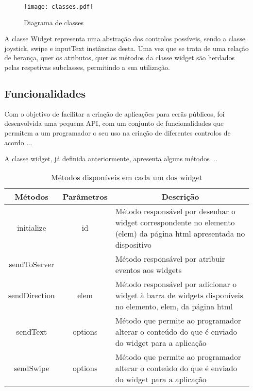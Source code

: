 \begin{figure}[ht]
\centering
\texttt{[image: classes.pdf]}
\caption[\textit{classes}] {Diagrama de classes}
\label{fig:classes}
\end{figure}

A classe Widget representa uma abstração dos controlos possíveis, sendo a classe joystick, swipe e inputText instâncias desta. Uma vez que se trata de uma relação de herança, quer os atributos, quer os métodos da classe widget são herdados pelas respetivas subclasses, permitindo a sua utilização.

\subsection{Funcionalidades}

	Com o objetivo de facilitar a criação de aplicações para ecrãs públicos, foi desenvolvida uma pequena API, com um conjunto de funcionalidades que permitem a um programador o seu uso na criação de diferentes controlos de acordo ...

	A classe widget, já definida anteriormente, apresenta alguns métodos ...

	\begin{table}[ht]
 	\renewcommand{\arraystretch}{1.5}
	\centering

	\begin{tabular}{ p{2cm}|p{2cm}|p{10cm}  }
	\multicolumn{1}{c}{\textbf{Métodos}} & \multicolumn{1}{c}{\textbf{Parâmetros}} & \multicolumn{1}{c}{\textbf{Descrição}} \\
	\hline
	\multicolumn{1}{c}{initialize} & \multicolumn{1}{c}{id} &Método responsável por desenhar o widget correspondente no elemento (elem) da página html apresentada no dispositivo \\
	\hline
	\multicolumn{1}{c}{sendToServer} & \multicolumn{1}{c}{} &Método responsável por atribuir eventos aos widgets \\
	\hline
	\multicolumn{1}{c}{sendDirection} & \multicolumn{1}{c}{elem} &Método responsável por adicionar o widget à barra de widgets disponíveis no elemento, elem, da página html \\
	\hline
	\multicolumn{1}{c}{sendText} & \multicolumn{1}{c}{options} &Método que permite ao programador alterar o conteúdo do que é enviado do widget para a aplicação  \\
	\hline
	\multicolumn{1}{c}{sendSwipe} & \multicolumn{1}{c}{options} &Método que permite ao programador alterar o conteúdo do que é enviado do widget para a aplicação  \\
	\hline
	\end{tabular}
	\caption{Métodos disponíveis em cada um dos widget}
	\label{table:widget_met}
	\end{table}
	
